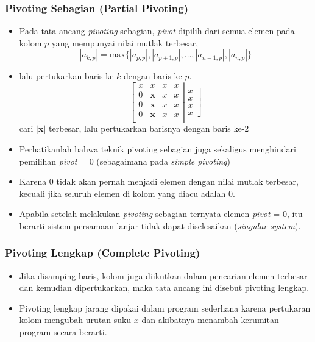 \documentclass[pdflatex,compress,mathserif]{beamer}
\begin{document}
\begin{frame}
	\frametitle{Pivoting Sebagian (Partial Pivoting)}
	\begin{itemize}
		\item Pada tata-ancang \textit{pivoting} sebagian, \textit{pivot} dipilih dari semua elemen pada kolom $ p $ yang mempunyai nilai mutlak terbesar,
		\[ |a_{k,p}| = \text{max}\{|a_{p,p}|,|a_{p+1,p}|,\dots,|a_{n-1,p}|, |a_{n,p}|\} \]
		\item  lalu pertukarkan baris ke-$ k $ dengan baris ke-$ p $.
		\[
		\left[
		\begin{matrix}
			x & x & x & x \\
			0 & \textbf{x} & x & x \\
			0 & \textbf{x} & x & x \\
			0 & \textbf{x} & x & x \\
		\end{matrix}
		\right|
		\left.
		\begin{matrix}
		x \\ x \\ x \\ x
		\end{matrix}
		\right]
		\] cari $ |\textbf{x}| $ terbesar, lalu pertukarkan barisnya dengan baris ke-2
	\end{itemize}
\end{frame}

\begin{frame}
	\begin{itemize}
		\item Perhatikanlah bahwa teknik pivoting sebagian juga sekaligus menghindari pemilihan \textit{pivot} = 0 (sebagaimana pada \textit{simple pivoting})
		\item Karena 0 tidak akan pernah menjadi elemen dengan nilai mutlak terbesar, kecuali jika seluruh elemen di kolom yang diacu adalah 0.
		\item Apabila setelah melakukan \textit{pivoting} sebagian ternyata elemen \textit{pivot} = 0, itu berarti sistem persamaan lanjar tidak dapat diselesaikan (\textit{singular system}).
	\end{itemize}
\end{frame}

\begin{frame}
	\frametitle{Pivoting Lengkap (Complete Pivoting)}
	\begin{itemize}
		\item Jika disamping baris, kolom juga diikutkan dalam pencarian elemen terbesar dan kemudian dipertukarkan, maka tata ancang ini disebut pivoting lengkap.
		\item Pivoting lengkap jarang dipakai dalam program sederhana karena pertukaran kolom mengubah urutan suku $ x $ dan akibatnya menambah kerumitan program secara berarti.
	\end{itemize}
\end{frame}
\end{document}
